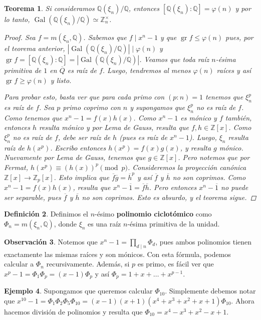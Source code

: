 \documentclass[12pt]{book}
\newtheorem{teo}{Teorema}[section]
\theoremstyle{definition}
\newtheorem{obs}[teo]{Observación}
\newtheorem{defn}[teo]{Definición}
\newtheorem{ex}[teo]{Ejemplo}
\newcommand{\ZZ}{\mathbb{Z}}      %
\newcommand{\QQ}{\mathbb{Q}}
\DeclareMathOperator{\gr}{gr}
\DeclareMathOperator{\Gal}{Gal}
\begin{document}
\begin{teo}
Si consideramos $\QQ(\xi_n)/\QQ$, entonces $[\QQ(\xi_n):\QQ]=\varphi(n)$ y por lo tanto, $\Gal(\QQ(\xi_n)/\QQ)\simeq\ZZ_n^\times$.
\begin{proof}
Sea $f=m(\xi_n,\QQ)$. Sabemos que $f\mid x^n - 1$ y que $\gr f \leq \varphi(n)$ pues, por el teorema anterior, $|\Gal(\QQ(\xi_n)/\QQ)|\mid \varphi(n)$ y $\gr f = [\QQ(\xi_n):\QQ] = |\Gal(\QQ(\xi_n)/\QQ)|$. Veamos que toda raíz $n$-ésima primitiva de $1$ en $\overline{Q}$ es raíz de $f$. Luego, tendremos al menos $\varphi(n)$ raíces y así $\gr f \geq \varphi(n)$ y listo.

Para probar esto, basta ver que para cada primo con $(p:n)=1$ tenemos que $\xi_n^p$ es raíz de $f$. Sea $p$ primo coprimo con $n$ y supongamos que $\xi_n^p$ no es raíz de $f$. Como tenemos que $x^n -1 = f(x)h(x)$. Como $x^n - 1$ es mónico y $f$ también, entonces $h$ resulta mónico y por Lema de Gauss, resulta que $f,h\in\ZZ[x]$. Como $\xi_n^p$ no es raíz de $f$, debe ser raíz de $h$ (pues es raíz de $x^n - 1$). Luego, $\xi_n$ resulta raíz de $h(x^p)$. Escribo entonces $h(x^p) = f(x)g(x)$, y resulta $g$ mónico. Nuevamente por Lema de Gauss, tenemos que $g\in\ZZ[x]$. Pero notemos que por Fermat, $h(x^p)\equiv (h(x))^p \pmod{p}$. Consideremos la proyección canónica $\ZZ[x]\to\ZZ_p[x]$. Esto implica que $\overline{f}\overline{g} = \overline{h}^p$ y así $\overline{f}$ y $\overline{h}$ no son coprimos. Como $x^n -1 = f(x)h(x)$, resulta que $x^n - \overline{1} = \overline{f}\overline{h}$. Pero entonces $x^n - \overline{1}$ no puede ser separable, pues $\overline{f}$ y $\overline{h}$ no son coprimos. Esto es absurdo, y el teorema sigue.
\end{proof}
\end{teo}

\begin{defn}
Definimos el $n$-ésimo \textbf{polinomio ciclotómico} como $\Phi_n = m(\xi_n,\QQ)$, donde $\xi_n$ es una raíz $n$-ésima primitiva de la unidad.
\end{defn}

\begin{obs}
Notemos que $x^n - 1  = \displaystyle\prod_{d\mid n}\Phi_d$, pues ambos polinomios tienen exactamente las mismas raíces y son mónicos. Con esta fórmula, podemos calcular a $\Phi_n$ recursivamente. Además, si $p$ es primo, es fácil ver que $x^p - 1 = \Phi_1 \Phi_p = (x-1)\Phi_p$ y así $\Phi_p = 1 + x + \ldots + x^{p-1}$. 
\end{obs}

\begin{ex}
Supongamos que queremos calcular $\Phi_{10}$. Simplemente debemos notar que $x^{10} - 1 = \Phi_1\Phi_2\Phi_5\Phi_{10} = (x-1)(x+1)(x^4 + x^3 + x^2 + x + 1)\Phi_{10}$. Ahora hacemos división de polinomios y resulta que $\Phi_{10} = x^4 - x^3 + x^2 - x + 1$.
\end{ex}
\end{document}
